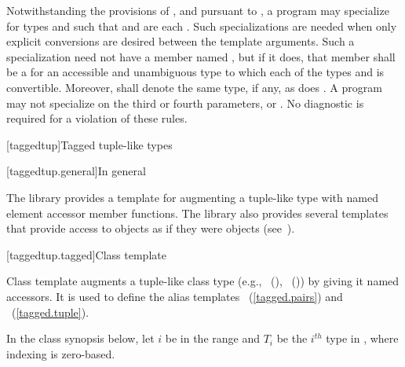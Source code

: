 \pnum
Notwithstanding the provisions of , and
pursuant to ,
a program may specialize 
for types  and  such that
 and
 are each .
\enternote Such specializations are needed when only explicit conversions
are desired between the template arguments. \exitnote
Such a specialization need not have a member named ,
but if it does, that member shall be a 
for an accessible and unambiguous type 
to which each of the types  and  is convertible.
Moreover,  shall denote
the same type, if any, as does .
A program may not specialize  on the third or
fourth parameters,  or . No diagnostic is required for
a violation of these rules.

[taggedtup]{Tagged tuple-like types}

[taggedtup.general]{In general}

\pnum The library provides a template for augmenting a tuple-like type with named element accessor
member functions. The library also provides several templates that provide access to 
objects as if they were  objects (see~).

[taggedtup.tagged]{Class template }

\pnum
Class template  augments a tuple-like class type (e.g., ~(),
~()) by giving it named accessors. It is used to define the alias
templates ~(\ref{tagged.pairs}) and
~(\ref{tagged.tuple}).

\pnum In the class synopsis below, let $i$ be in the range
 and $T_i$ be the $i^{th}$ type in , where indexing
is zero-based.

